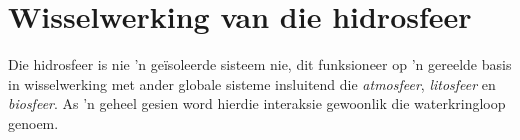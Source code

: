 
\section{Wisselwerking van die hidrosfeer}
            \nopagebreak

Die hidrosfeer is nie  'n geïsoleerde sisteem nie, dit funksioneer op  'n gereelde basis in wisselwerking met ander globale sisteme insluitend die \textsl{atmosfeer}, \textsl{litosfeer} en \textsl{biosfeer}. As  'n geheel gesien word hierdie interaksie gewoonlik die waterkringloop genoem.


